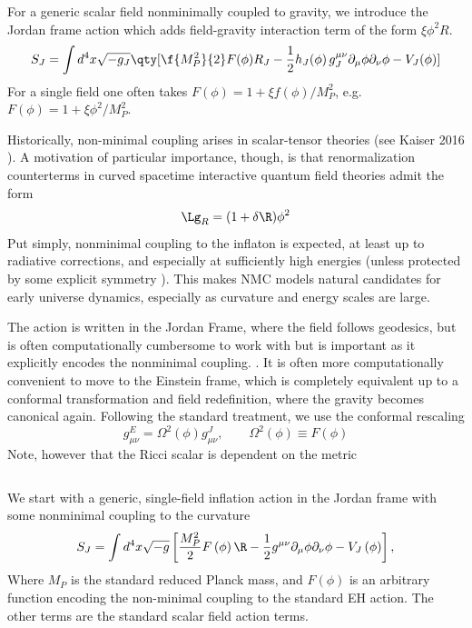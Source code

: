 For a generic scalar field nonminimally coupled to gravity, we introduce the Jordan frame action which adds field-gravity interaction term of the form $\xi\phi^2R$. 
\begin{equation}
    S_J=\int d^4x \sqrt{-g_J}\qty[\f{M_P^2}{2}F(\phi)R_J-\frac{1}{2}h_{J}(\phi)\,g_J^{\mu\nu}\partial_\mu\phi \partial_\nu\phi - V_J(\phi)]
\end{equation}
For a single field one often takes $F(\phi)=1+\xi f(\phi)/M_P^2$, e.g. $F(\phi)=1+\xi\phi^2/M_P^2$. 


Historically, non-minimal coupling arises in scalar-tensor theories (see Kaiser 2016 ). A motivation of particular importance, though, is that renormalization counterterms in curved spacetime interactive quantum field theories admit the form
\[
\Lg_{R}=(1+\delta \R)\phi^2
\]
Put simply, nonminimal coupling to the inflaton is expected, at least up to radiative corrections, and especially at sufficiently high energies (unless protected by some explicit symmetry \cite{Kaiser2016NMC}\cite{Hertzberg2010NMC}). This makes NMC models natural candidates for early universe dynamics, especially as curvature and energy scales are large.




The action is written in the Jordan Frame, where the field follows geodesics, but is often computationally cumbersome to work with but is important as it explicitly encodes the nonminimal coupling. . It is often more computationally convenient to move to the Einstein frame, which is completely equivalent up to a conformal transformation and field redefinition, where the gravity  becomes canonical again. Following the standard treatment, we use the conformal rescaling
\begin{equation}
    g_{\mu\nu}^E=\Omega^2(\phi)g^J_{\mu\nu}, \qquad \Omega^2(\phi)\equiv F(\phi)
\end{equation}
Note, however that the Ricci scalar is dependent on the metric


\[\]


We start with a generic, single-field inflation action in the Jordan frame with some nonminimal coupling to the curvature
\[
S_J=\int d^4 x \sqrt{-g}\left[\frac{M_P^2}{2} F\left(\phi\right) \R-\frac{1}{2} g^{\mu \nu} \partial_\mu \phi \partial_\nu \phi-V_J\left(\phi\right)\right],
\]
Where  $M_P$ is the standard reduced Planck mass, and $F(\phi)$ is an arbitrary function encoding the non-minimal coupling to the standard EH action. The other terms are the standard scalar field action terms. 

